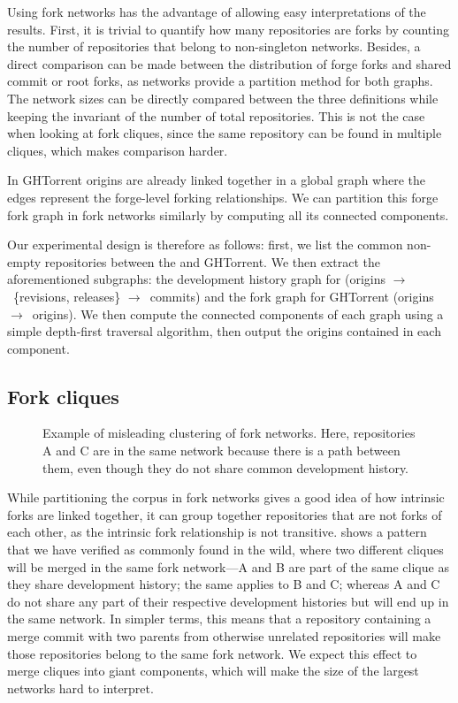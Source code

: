 Using fork networks has the advantage of allowing easy interpretations of the
results. First, it is trivial to quantify how many repositories are forks by
counting the number of repositories that belong to non-singleton networks.
Besides, a direct comparison can be made between the distribution of forge
forks and shared commit or root forks, as networks provide a partition method
for both graphs. The network sizes can be directly compared between the three
definitions while keeping the invariant of the number of total repositories.
This is not the case when looking at fork cliques, since the same repository
can be found in multiple cliques, which makes comparison harder.

In GHTorrent origins are already linked together in a global graph where the
edges represent the forge-level forking relationships. We can partition this
forge fork graph in fork networks similarly by computing all its connected
components.

Our experimental design is therefore as follows: first, we list the common
non-empty repositories between the \SWHGD{} and GHTorrent. We then extract the
aforementioned subgraphs: the development history graph for \SWH{} (origins
$\to$~\{revisions, releases\} $\to$~commits) and the fork graph for GHTorrent
(origins $\to$~origins). We then compute the connected components of each graph
using a simple depth-first traversal algorithm, then output the origins
contained in each component.

\subsection{Fork cliques}%
\label{sec:methodology-fork-cliques}

\begin{figure}[t]
  \centering
  
  \caption{Example of misleading clustering of fork networks.  Here,
    repositories A and C are in the same network because there is a path
    between them, even though they do not share common development history.}%
  \label{fig:fork-transitive-fail}
\end{figure}

While partitioning the corpus in fork networks gives a good idea of how
intrinsic forks are linked together, it can group together repositories that
are not forks of each other, as the intrinsic fork relationship is not
transitive.  shows a pattern that we
have verified as commonly found in the wild, where two different cliques will
be merged in the same fork network---A and B are part of the same clique as
they share development history; the same applies to B and C\@; whereas A and C
do not share any part of their respective development histories but will end up
in the same network. In simpler terms, this means that a repository containing
a merge commit with two parents from otherwise unrelated repositories will make
those repositories belong to the same fork network.  We expect this effect to
merge cliques into giant components, which will make the size of the largest
networks hard to interpret.

